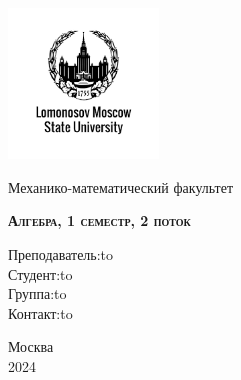 \documentclass[a4paper, 12pt]{article}
\theoremstyle{definition}
\begin{document}
  \begin{titlepage}
    \newpage
    
    \begin{center}
    \includegraphics[width=4cm]{.image/image.png}
    \end{center}
    
    \vspace{4em}
    
    \begin{center}
    \Large Механико-математический факультет  
    \end{center}
    
    \vspace{2em}
    
    \begin{center}
    \large{\textsc{\textbf{Алгебра, 1 семестр, 2 поток}}}
    \end{center}
    
    \vspace{6em}
    

    
    \newbox{\lbox}
    \newlength{\maxl}
    \setlength{\maxl}{\wd\lbox}
    \hfill\parbox{11cm}
    {
    \hspace*{5cm}\hspace*{-5cm}Преподаватель:\hfill\hbox to \\

    \hspace*{5cm}\hspace*{-5cm}Студент:\hfill\hbox to\\

    \hspace*{5cm}\hspace*{-5cm}Группа:\hfill\hbox to \\
    
    \hspace*{5cm}\hspace*{-5cm}Контакт:\hfill\hbox to
    }

    \vspace{\fill}
    
    \begin{center}
    Москва \\2024 
    \end{center}
  \end{titlepage}
  \tableofcontents
  \fontsize{14pt}{20pt}\selectfont
  \newpage
  \fontsize{14pt}{20pt}\selectfont
\end{document}
